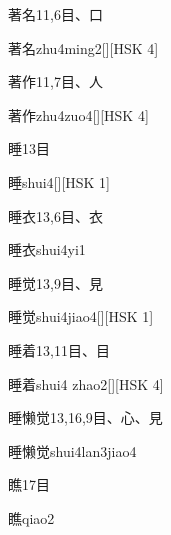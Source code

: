 \begin{entry}{著名}{11,6}{⽬、⼝}
  \begin{phonetics}{著名}{zhu4ming2}[][HSK 4]
  \end{phonetics}
\end{entry}

\begin{entry}{著作}{11,7}{⽬、⼈}
  \begin{phonetics}{著作}{zhu4zuo4}[][HSK 4]
  \end{phonetics}
\end{entry}

\begin{entry}{睡}{13}{⽬}
  \begin{phonetics}{睡}{shui4}[][HSK 1]
  \end{phonetics}
\end{entry}

\begin{entry}{睡衣}{13,6}{⽬、⾐}
  \begin{phonetics}{睡衣}{shui4yi1}
  \end{phonetics}
\end{entry}

\begin{entry}{睡觉}{13,9}{⽬、⾒}
  \begin{phonetics}{睡觉}{shui4jiao4}[][HSK 1]
  \end{phonetics}
\end{entry}

\begin{entry}{睡着}{13,11}{⽬、⽬}
  \begin{phonetics}{睡着}{shui4 zhao2}[][HSK 4]
  \end{phonetics}
\end{entry}

\begin{entry}{睡懒觉}{13,16,9}{⽬、⼼、⾒}
  \begin{phonetics}{睡懒觉}{shui4lan3jiao4}
  \end{phonetics}
\end{entry}

\begin{entry}{瞧}{17}{⽬}
  \begin{phonetics}{瞧}{qiao2}
  \end{phonetics}
\end{entry}


